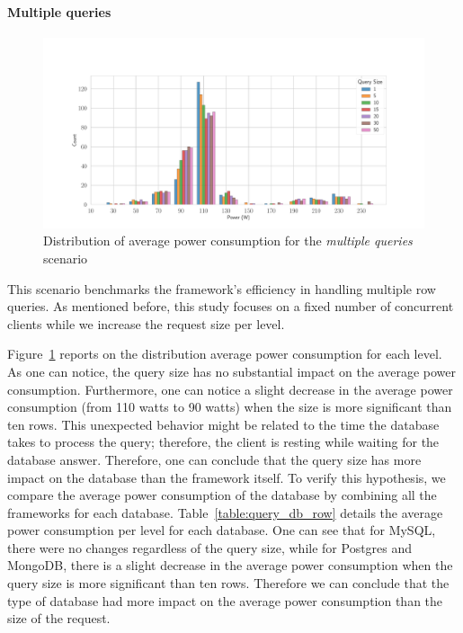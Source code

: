 \paragraph{Multiple queries}
\begin{figure}[!h]
    \centering
    \includegraphics[width=\textwidth,height=\textheight,keepaspectratio]{imgs/histogram_av_power_cpu_query}
    \caption{Distribution of average power consumption for the \emph{multiple queries} scenario }
    \label{fig:av_power_query}
\end{figure}

This scenario benchmarks the framework's efficiency in handling multiple row queries.
As mentioned before, this study focuses on a fixed number of concurrent clients while we increase the request size per level.

Figure~\ref{fig:av_power_query} reports on the distribution average power consumption for each level.
As one can notice, the query size has no substantial impact on the average power consumption.
Furthermore, one can notice a slight decrease in the average power consumption (from 110 watts to 90 watts) when the size is more significant than ten rows.
This unexpected behavior might be related to the time the database takes to process the query; therefore, the client is resting while waiting for the database answer.
Therefore, one can conclude that the query size has more impact on the database than the framework itself.
To verify this hypothesis, we compare the average power consumption of the database by combining all the frameworks for each database.
Table~\ref{table:query_db_row} details the average power consumption per level for each database.
One can see that for MySQL, there were no changes regardless of the query size, while for Postgres and MongoDB, there is a slight decrease in the average power consumption when the query size is more significant than ten rows. Therefore we can conclude that the type of database had more impact on the average power consumption than the size of the request.


